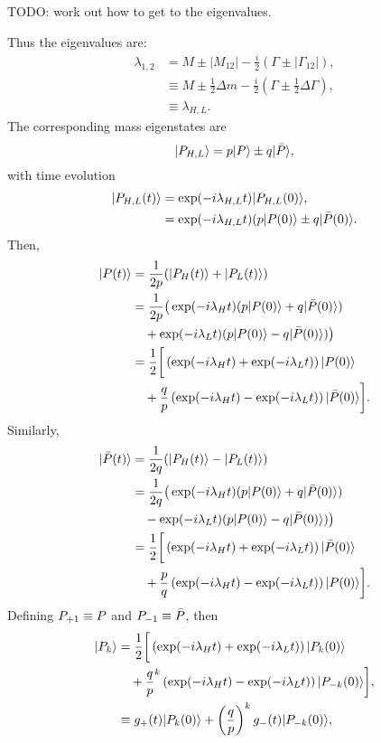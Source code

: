 \documentclass{report}
\def\PPbar{\ensuremath{\bar{\PP}}\xspace}
\def\PPp{\ensuremath{\PP_{+1}}\xspace}
\def\PPm{\ensuremath{\PP_{-1}}\xspace}
\def\Deltam{\ensuremath{\Delta m}\xspace}
\def\Deltagamma{\ensuremath{\Delta\Gamma}\xspace}
\def\lambdahl{\ensuremath{\lambda_{H,L}}\xspace}
\def\PPhl{\ensuremath{\PP_{H,L}}\xspace}
\def\PPh{\ensuremath{\PP_H}\xspace}
\def\PPl{\ensuremath{\PP_L}\xspace}
\def\half{\ensuremath{\frac{1}{2}}\xspace}
\def\PPk{\ensuremath{\PP_k}\xspace}
\def\PPkm{\ensuremath{\PP_{-k}}\xspace}
\begin{document}
TODO: work out how to get to the eigenvalues.

Thus the eigenvalues are:
\begin{align}
  \lambda_{1,2} &= M \pm |M_{12}| - \frac{i}{2}(\Gamma \pm |\Gamma_{12}|), \\
  &\equiv M \pm \frac{1}{2} \Deltam - \frac{i}{2}\left(\Gamma \pm \frac{1}{2} \Deltagamma\right),\\
  &\equiv \lambdahl.
\end{align}
The corresponding mass eigenstates are
\begin{equation}
  \ket{\PPhl} = p \ket{\PP} \pm q \ket{\PPbar},
\end{equation}
with time evolution
\begin{align}
  \ket{\PPhl(t)} &= \exp(-i \lambdahl t) \ket{\PPhl(0)}, \\
  &= \exp(-i \lambdahl t)(p\ket{\PP(0)} \pm q \ket{\PPbar(0)}.
\end{align}
Then,
\begin{align}
  \ket{\PP(t)} & = \frac{1}{2p}(\ket{\PPh(t)} + \ket{\PPl(t)}) \\
  & = \frac{1}{2p}\big(\exp(-i\lambda_H t)(p\ket{\PP(0)} + q \ket{\PPbar(0)}) \\
  & \quad + \exp(-i\lambda_L t)(p\ket{\PP(0)} - q \ket{\PPbar(0)})\big) \\
  &= \half \bigg[\left(\exp(-i\lambda_H t) + \exp(-i\lambda_L t)\right) \ket{\PP(0)} \\
    & \quad + \frac{q}{p}\left(\exp(-i\lambda_H t) - \exp(-i\lambda_L t)\right) \ket{\PPbar(0)}\bigg].
\end{align}
Similarly,
\begin{align}
  \ket{\PPbar(t)} & = \frac{1}{2q}(\ket{\PPh(t)} - \ket{\PPl(t)}) \\
  & = \frac{1}{2q}\big(\exp(-i\lambda_H t)(p\ket{\PP(0)} + q \ket{\PPbar(0)}) \\
  & \quad - \exp(-i\lambda_L t)(p\ket{\PP(0)} - q \ket{\PPbar(0)})\big) \\
  &= \half \bigg[\left(\exp(-i\lambda_H t) + \exp(-i\lambda_L t)\right) \ket{\PPbar(0)} \\
    & \quad + \frac{p}{q}\left(\exp(-i\lambda_H t) - \exp(-i\lambda_L t)\right) \ket{\PP(0)}\bigg].
\end{align}
Defining $\PPp \equiv \PP$ and $\PPm \equiv \PPbar$, then
\begin{align}
  \ket{\PPk} &= \half \bigg[\left(\exp(-i \lambda_H t) + \exp(-i \lambda_L t)\right) \ket{\PPk(0)} \\
    & \quad + \frac{q}{p}^k \left(\exp(-i \lambda_H t) - \exp(-i \lambda_L t)\right) \ket{\PPkm(0)}\bigg], \\
    &\equiv g_+(t) \ket{\PPk(0)} + \left(\frac{q}{p}\right)^k g_-(t) \ket{\PPkm(0)},
\end{align}
\end{document}

